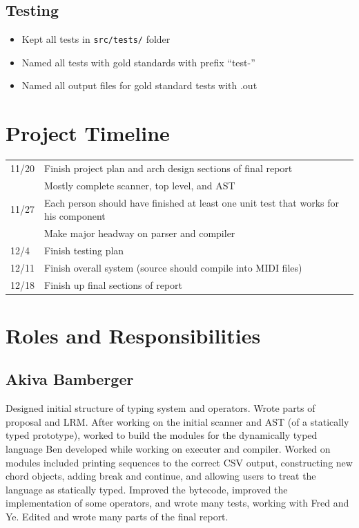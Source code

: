 \documentclass[12pt,A4]{book}
\begin{document}
\subsection{Testing}
\begin{itemize}
\item Kept all tests in \verb|src/tests/| folder
\item Named all tests with gold standards with prefix ``test-''
\item Named all output files for gold standard tests with .out
\end{itemize}
\section{Project Timeline}
\begin{tabular}{l p{}}
11/20 & Finish project plan and arch design sections of final report\\
      & Mostly complete scanner, top level, and AST\\
11/27 & Each person should have finished at least one unit test that works for his component\\
      & Make major headway on parser and compiler\\
12/4 & Finish testing plan\\
12/11 & Finish overall system (source should compile into MIDI files)\\
12/18 & Finish up final sections of report\\
\end{tabular}
\section{Roles and Responsibilities}
\subsection{Akiva Bamberger}
Designed initial structure of typing system and operators. Wrote parts of proposal and LRM. After working on the initial scanner and AST (of a statically typed prototype), worked to build the modules for the dynamically typed language Ben developed while working on executer and compiler. Worked on modules included printing sequences to the correct CSV output, constructing new chord objects, adding break and continue, and allowing users to treat the language as statically typed. Improved the bytecode, improved the implementation of some operators, and wrote many tests, working with Fred and Ye. Edited and wrote many parts of the final report.
\end{document}
